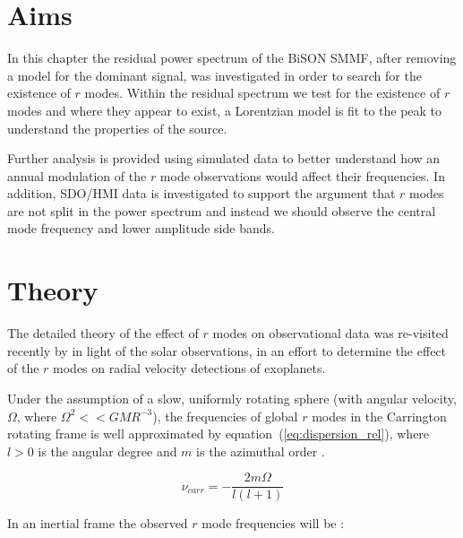 \section{Aims}\label{sec:r-mode_aims}

In this chapter the residual power spectrum of the BiSON SMMF, after removing a model for the dominant signal, was investigated in order to search for the existence of $r$ modes. Within the residual spectrum we test for the existence of $r$ modes and where they appear to exist, a Lorentzian model is fit to the peak to understand the properties of the source.

Further analysis is provided using simulated data to better understand how an annual modulation of the $r$ mode observations would affect their frequencies. In addition, SDO/HMI data is investigated to support the argument that $r$ modes are not split in the power spectrum and instead we should observe the central mode frequency and lower amplitude side bands.



\section{Theory}\label{sec:r-mode_theory}

The detailed theory of the effect of $r$ modes on observational data was re-visited recently by \citet{lanza_sectoral_2019} in light of the solar observations, in an effort to determine the effect of the $r$ modes on radial velocity detections of exoplanets.

Under the assumption of a slow, uniformly rotating sphere (with angular velocity, $\Omega$, where $\Omega^2 << GMR^{-3}$), the frequencies of global $r$ modes in the Carrington rotating frame is well approximated by equation~(\ref{eq:dispersion_rel}), where $l > 0$ is the angular degree and $m$ is the azimuthal order \citep{loptien_global-scale_2018, lanza_sectoral_2019}.

\begin{equation}
\nu_{carr} = - \frac{2m\Omega}{l(l + 1)}
\label{eq:dispersion_rel}
\end{equation}

In an inertial frame the observed $r$ mode frequencies will be \citep{lanza_sectoral_2019}:

